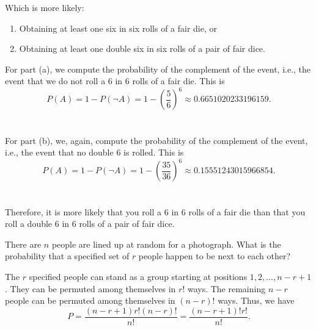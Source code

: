\begin{problem}[Handout 1, \# 12]
  Which is more likely:
  \begin{enumerate}[label=(\alph*),noitemsep]
  \item Obtaining at least one six in six rolls of a fair die, or
  \item Obtaining at least one double six in six rolls of a pair of fair
    dice.
  \end{enumerate}
\end{problem}
\begin{solution*}
  For part (a), we compute the probability of the complement of the event,
  i.e., the event that we do not roll a \(6\) in \(6\) rolls of a fair
  die. This is
  \[
    P(A)=1-P(\lnot
    A)=1-\left(\frac{5}{6}\right)^6\approx\num{0.6651020233196159}.
  \]
  \\\\
  For part (b), we, again, compute the probability of the complement of the
  event, i.e., the event that no double \(6\) is rolled. This is
  \[
    P(A)=1-P(\lnot
    A)=1-\left(\frac{35}{36}\right)^6\approx\num{0.15551243015966854}.
  \]
  \\\\
  Therefore, it is more likely that you roll a \(6\) in \(6\) rolls of a
  fair die than that you roll a double \(6\) in \(6\) rolls of a pair of
  fair dice.
\end{solution*}

\begin{problem}[Handout 1, \# 13]
  There are \(n\) people are lined up at random for a photograph. What is
  the probability that a specified set of \(r\) people happen to be next to
  each other?
\end{problem}
\begin{solution*}
  The \(r\) specified people can stand as a group starting at positions
  \(1,2,\dotsc,n-r+1\). They can be permuted among themselves in \(r!\)
  ways. The remaining \(n-r\) people can be permuted among themselves in
  \((n-r)!\) ways. Thus, we have
  \[
    P=\frac{(n-r+1)r!(n-r)!}{n!}=\frac{(n-r+1)!r!}{n!}.
  \]
\end{solution*}

